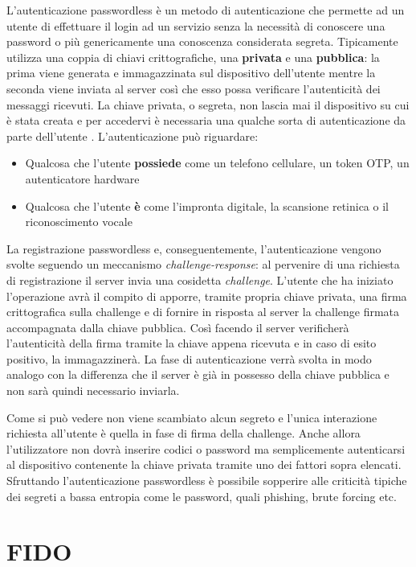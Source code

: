 L'autenticazione passwordless è un metodo di autenticazione che permette ad un utente di effettuare il login ad un servizio senza la necessità di conoscere una password o più genericamente una conoscenza considerata segreta. Tipicamente utilizza una coppia di chiavi crittografiche, una \textbf{privata} e una \textbf{pubblica}: la prima viene generata e immagazzinata sul dispositivo dell'utente mentre la seconda viene inviata al server così che esso possa verificare l'autenticità dei messaggi ricevuti. La chiave privata, o segreta, non lascia mai il dispositivo su cui è stata creata e per accedervi è necessaria una qualche sorta di autenticazione da parte dell'utente \cite{wiki:passwordless}. L'autenticazione può riguardare:

\begin{itemize}
	\item Qualcosa che l'utente \textbf{possiede} come un telefono cellulare, un token OTP, un autenticatore hardware
	\item Qualcosa che l'utente \textbf{è} come l'impronta digitale, la scansione retinica o il riconoscimento vocale 
\end{itemize}

La registrazione passwordless e, conseguentemente, l'autenticazione vengono svolte seguendo un meccanismo \emph{challenge-response}: al pervenire di una richiesta di registrazione il server invia una cosidetta \emph{challenge}. L'utente che ha iniziato l'operazione avrà il compito di apporre, tramite propria chiave privata, una firma crittografica sulla challenge e di fornire in risposta al server la challenge firmata accompagnata dalla chiave pubblica. Così facendo il server verificherà l'autenticità della firma tramite la chiave appena ricevuta e in caso di esito positivo, la immagazzinerà. La fase di autenticazione verrà svolta in modo analogo con la differenza che il server è già in possesso della chiave pubblica e non sarà quindi necessario inviarla.

Come si può vedere non viene scambiato alcun segreto e l'unica interazione richiesta all'utente è quella in fase di firma della challenge. Anche allora l'utilizzatore non dovrà inserire codici o password ma semplicemente autenticarsi al dispositivo contenente la chiave privata tramite uno dei fattori sopra elencati. Sfruttando l'autenticazione passwordless è possibile sopperire alle criticità tipiche dei segreti a bassa entropia come le password, quali phishing, brute forcing etc. 

\section{FIDO}
\label{fido}

